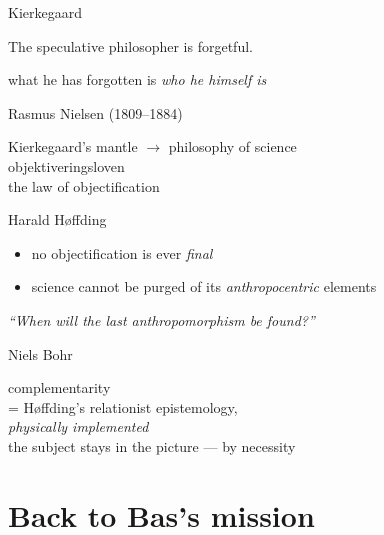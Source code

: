\documentclass[11pt,aspectratio=169]{beamer}
\begin{document}
\begin{frame}{Kierkegaard}
  \begin{center}
    The speculative philosopher is \alert{forgetful.}
  \end{center}
  \vspace{1em}
  \begin{center}
    {\small what he has forgotten is \emph{who he himself is}}
  \end{center}
\end{frame}

\begin{frame}{Rasmus Nielsen \;(1809--1884)}
  \begin{center}
    Kierkegaard's mantle $\rightarrow$ philosophy of science\\[1em]
    \alert{objektiveringsloven}\\[4pt]
    {\small\color{faint} the law of objectification}
  \end{center}
\end{frame}

\begin{frame}{Harald Høffding}
  \begin{itemize}
    \item no objectification is ever \emph{final}
    \item science cannot be purged of its \emph{anthropocentric} elements
  \end{itemize}
  \vspace{1em}
  \begin{center}
    {\small\itshape ``When will the last anthropomorphism be found?''}
  \end{center}
\end{frame}

\begin{frame}{Niels Bohr}
  \begin{center}
    \large complementarity\\[8pt]
    {\small = Høffding's relationist epistemology,\\ \emph{physically implemented}}\\[10pt]
    \alert{the subject stays in the picture --- by necessity}
  \end{center}
\end{frame}

\section{Back to Bas's mission}
\end{document}
